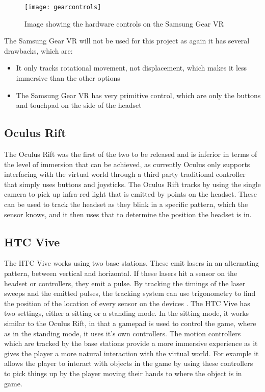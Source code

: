 \begin{figure}[h]
	\texttt{[image: gearcontrols]}
	\centering
	\caption{Image showing the hardware controls on the Samsung Gear VR \cite{gearbuttons}}
	\label{fig:gearcontrols}
\end{figure}

The Samsung Gear VR will not be used for this project as again it has several drawbacks, which are:

\begin{itemize}
	\item It only tracks rotational movement, not displacement, which makes it less immersive than the other options
	\item The Samsung Gear VR has very primitive control, which are only the buttons and touchpad on the side of the headset
\end{itemize}		

\subsection{Oculus Rift}
The Oculus Rift was the first of the two to be released and is inferior in terms of the level of immersion that can be achieved, as currently Oculus only supports interfacing with the virtual world through a third party traditional controller that simply uses buttons and joysticks. The Oculus Rift tracks by using the single camera to pick up infra-red light that is emitted by points on the headset. These can be used to track the headset as they blink in a specific pattern, which the sensor knows, and it then uses that to determine the position the headset is in.

\subsection{HTC Vive}
The HTC Vive works using two base stations. These emit lasers in an alternating pattern, between vertical and horizontal. If these lasers hit a sensor on the headset or controllers, they emit a pulse. By tracking the timings of the laser sweeps and the emitted pulses, the tracking system can use trigonometry to find the position of the location of every sensor on the devices \cite{vivetechnology}. The HTC Vive has two settings, either a sitting or a standing mode. In the sitting mode, it works similar to the Oculus Rift, in that a gamepad is used to control the game, where as in the standing mode, it uses it's own controllers. The motion controllers which are tracked by the base stations provide a more immersive experience as it gives the player a more natural interaction with the virtual world. For example it allows the player to interact with objects in the game by using these controllers to pick things up by the player moving their hands to where the object is in game.
\clearpage

